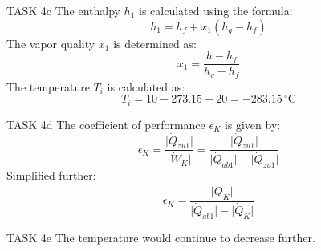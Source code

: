 TASK 4c  
The enthalpy \( h_1 \) is calculated using the formula:  
\[
h_1 = h_f + x_1 (h_g - h_f)
\]  
The vapor quality \( x_1 \) is determined as:  
\[
x_1 = \frac{h - h_f}{h_g - h_f}
\]  
The temperature \( T_i \) is calculated as:  
\[
T_i = 10 - 273.15 - 20 = -283.15 \, ^\circ\text{C}
\]  

TASK 4d  
The coefficient of performance \( \epsilon_K \) is given by:  
\[
\epsilon_K = \frac{\lvert \dot{Q}_{zu1} \rvert}{\lvert \dot{W}_K \rvert} = \frac{\lvert \dot{Q}_{zu1} \rvert}{\lvert \dot{Q}_{ab1} \rvert - \lvert \dot{Q}_{zu1} \rvert}
\]  
Simplified further:  
\[
\epsilon_K = \frac{\lvert \dot{Q}_K \rvert}{\lvert \dot{Q}_{ab1} \rvert - \lvert \dot{Q}_K \rvert}
\]  

TASK 4e  
The temperature would continue to decrease further.  
